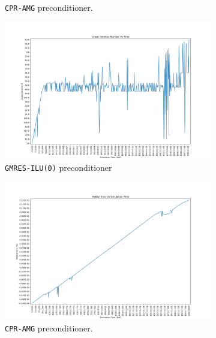 \begin{figure}
\begin{subfigure}{.5\textwidth}
  \caption{\texttt{CPR-AMG} preconditioner.}
	\label{case3_its_cpr}
\end{subfigure}%
\begin{subfigure}{.5\textwidth}
  \centering
  \includegraphics[width=1.1\linewidth]{figures/case3/ilu/its_time.png_reduced.png}
  \caption{\texttt{GMRES-ILU(0)} preconditioner}
	\label{case3_its_ilu}
\end{subfigure}
\begin{subfigure}{.5\textwidth}
  \centering
  \includegraphics[width=1.1\linewidth]{figures/case3/cpr/matbalerr_time.png_reduced.png}
  \caption{\texttt{CPR-AMG} preconditioner.}
	\label{case3_matbalerr_cpr}
\end{subfigure}%
\begin{subfigure}{.5\textwidth}
  \centering

\end{subfigure}
\end{figure}
